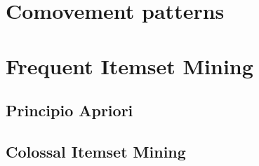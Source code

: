 \section{Comovement patterns}\label{sec:problem:comovements-pattern}


\section{Frequent Itemset Mining}\label{sec:problem:frequent-itemset-mining}


\subsection{Principio Apriori}\label{subsec:problem:apriori}


\subsection{Colossal Itemset Mining}\label{subsec:problem:cim}



